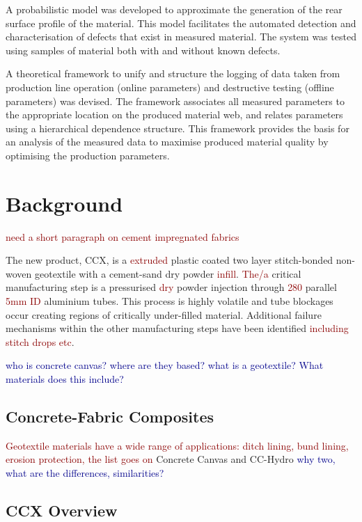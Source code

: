 \documentclass[12pt]{report}
\newcommand{\tcr}[1]{\textcolor{darkRed}{#1}}
\newcommand{\tcb}[1]{\textcolor{darkBlue}{#1}}
\begin{document}
        A probabilistic model was developed to approximate the generation of the rear surface profile of the material. This model facilitates the automated detection and characterisation of defects that exist in measured material. The system was tested using samples of material both with and without known defects.
        
        A theoretical framework to unify and structure the logging of data taken from production line operation (online parameters) and destructive testing (offline parameters) was devised. The framework associates all measured parameters to the appropriate location on the produced material web, and relates parameters using a hierarchical dependence structure. This framework provides the basis for an analysis of the measured data to maximise produced material quality by optimising the production parameters.
        
        
        
\pagebreak
\chapter{Background}

    \tcr{need a short paragraph on cement impregnated fabrics}
    
    The new product, CCX, is a \tcr{extruded} plastic  coated two layer stitch-bonded non-woven geotextile with a cement-sand dry powder \tcr{infill}. \tcr{The/a} critical manufacturing step is a pressurised \tcr{dry} powder injection  through \tcr{280} parallel \tcr{5mm ID} aluminium tubes. This process is highly volatile and tube blockages occur creating regions of critically under-filled material. Additional failure mechanisms within the other manufacturing steps have been identified \tcr{including stitch drops etc}.
    
    \tcb{who is concrete canvas? where are they based?}
    \tcb{what is a geotextile? What materials does this include?}
    
    
    \section{Concrete-Fabric Composites}
    \tcr{Geotextile materials have a wide range of applications: ditch lining, bund lining, erosion protection, the list goes on}
    Concrete Canvas and CC-Hydro \tcb{why two, what are the differences, similarities?}
    
    \section{CCX Overview}
\end{document}
